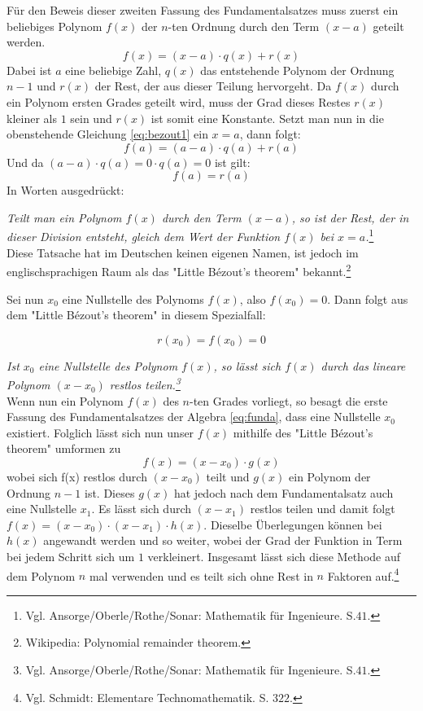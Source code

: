 \documentclass[a4paper,12pt]{article} %
\begin{document}
Für den Beweis dieser zweiten Fassung des Fundamentalsatzes muss zuerst ein beliebiges Polynom $f(x)$ der $n$-ten Ordnung durch den Term $(x-a)$ geteilt werden.
\begin{equation}\label{eq:bezout1}
f(x) = (x - a) \cdot q(x) + r(x)
\end{equation} 
Dabei ist $a$ eine beliebige Zahl, $q(x)$ das entstehende Polynom der Ordnung $n-1$ und $r(x)$ der Rest, der aus dieser Teilung hervorgeht.
Da $f(x)$ durch ein Polynom ersten Grades geteilt wird, muss der Grad dieses Restes $r(x)$ kleiner als $1$ sein und $r(x)$ ist somit eine Konstante.
Setzt man nun in die obenstehende Gleichung \eqref{eq:bezout1} ein $x=a$, dann folgt:
\[ f(a) = (a-a) \cdot q(a) + r(a) \]
Und da $(a - a) \cdot q(a) = 0 \cdot q(a) = 0 $ ist gilt:
\[ f(a) = r(a) \]
In Worten ausgedrückt:

\noindent \emph{Teilt man ein Polynom $f(x)$ durch den Term $(x-a)$, so ist der Rest, der in dieser Division entsteht, gleich dem Wert der Funktion $f(x)$ bei $x=a$.}\footnote{Vgl. Ansorge/Oberle/Rothe/Sonar: Mathematik für Ingenieure. S.$41$.}\\

Diese Tatsache hat im Deutschen keinen eigenen Namen, ist jedoch im englischsprachigen Raum als das "Little Bézout's theorem" {} bekannt.\footnote{Wikipedia: Polynomial remainder theorem.}

Sei nun $x_0$ eine Nullstelle des Polynoms $f(x)$, also $f(x_0)=0$. Dann folgt aus dem "Little Bézout's theorem" {}in diesem Spezialfall:


\begin{equation}\label{eq:bezout0}
r(x_0) = f(x_0)=0
\end{equation}


\noindent \emph{Ist $x_0$ eine Nullstelle des Polynom $f(x)$, so lässt sich $f(x)$ durch das lineare Polynom $(x-x_0)$ restlos teilen.\footnote{Vgl. Ansorge/Oberle/Rothe/Sonar: Mathematik für Ingenieure. S.$41$.}}\\



Wenn nun ein Polynom $f(x)$ des $n$-ten Grades vorliegt, so besagt die erste Fassung des Fundamentalsatzes der Algebra \eqref{eq:funda}, dass eine Nullstelle $x_0$ existiert. Folglich lässt sich nun unser $f(x)$ mithilfe des "Little Bézout's theorem" {} umformen zu
\[f(x)=(x-x_0) \cdot g(x)\]
wobei sich f(x) restlos durch $(x-x_0)$ teilt und $g(x)$ ein Polynom der Ordnung $n-1$ ist.
Dieses $g(x)$ hat jedoch nach dem Fundamentalsatz auch eine Nullstelle $x_1$.
Es lässt sich durch $(x-x_1)$ restlos teilen und damit folgt $f(x) = (x-x_0) \cdot (x-x_1) \cdot h(x)$.
Dieselbe Überlegungen können bei $h(x)$ angewandt werden und so weiter, wobei der Grad der Funktion in Term bei jedem Schritt sich um $1$ verkleinert.
Insgesamt lässt sich diese Methode auf dem Polynom $n$ mal verwenden und es teilt sich ohne Rest in $n$ Faktoren auf.\footnote{Vgl. Schmidt: Elementare Technomathematik. S. $322$.}\\
\end{document}
